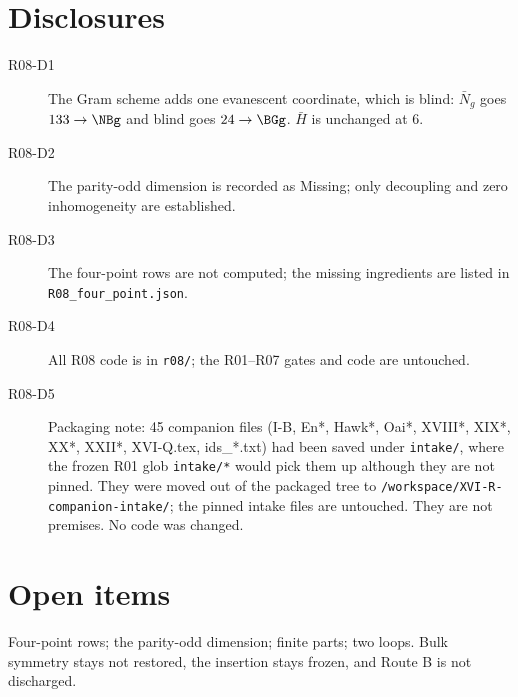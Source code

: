 \documentclass[11pt]{article}
\begin{document}
\section{Disclosures}
\begin{description}
\item[R08-D1] The Gram scheme adds one evanescent coordinate, which is blind: $\bar N_g$ goes $133\to\NBg$ and blind
goes $24\to\BGg$. $\bar H$ is unchanged at 6.
\item[R08-D2] The parity-odd dimension is recorded as Missing; only decoupling and zero inhomogeneity are established.
\item[R08-D3] The four-point rows are not computed; the missing ingredients are listed in \texttt{R08\_four\_point.json}.
\item[R08-D4] All R08 code is in \texttt{r08/}; the R01--R07 gates and code are untouched.
\item[R08-D5] Packaging note: 45 companion files (I-B, En*, Hawk*, Oai*, XVIII*, XIX*, XX*, XXII*, XVI-Q.tex, ids\_*.txt) had been saved under \texttt{intake/}, where the frozen R01 glob \texttt{intake/*} would pick them up although they are not pinned. They were moved out of the packaged tree to \texttt{/workspace/XVI-R-companion-intake/}; the pinned intake files are untouched. They are not premises. No code was changed.
\end{description}

\section{Open items}
Four-point rows; the parity-odd dimension; finite parts; two loops. Bulk symmetry stays not restored, the insertion stays
frozen, and Route B is not discharged.
\end{document}
